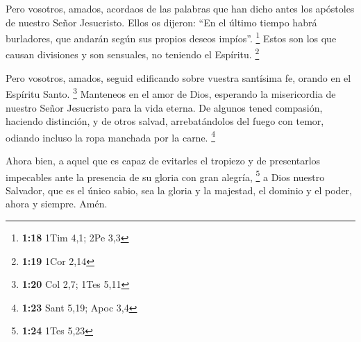  Pero vosotros, amados, acordaos de las palabras que han
dicho antes los apóstoles de nuestro Señor Jesucristo. 
Ellos os dijeron: ``En el último tiempo habrá burladores, que andarán
según sus propios deseos impíos''. \footnote{\textbf{1:18} 1Tim 4,1; 2Pe
  3,3}  Estos son los que causan divisiones y son
sensuales, no teniendo el Espíritu. \footnote{\textbf{1:19} 1Cor 2,14}

 Pero vosotros, amados, seguid edificando sobre vuestra
santísima fe, orando en el Espíritu Santo. \footnote{\textbf{1:20} Col
  2,7; 1Tes 5,11}  Manteneos en el amor de Dios,
esperando la misericordia de nuestro Señor Jesucristo para la vida
eterna.  De algunos tened compasión, haciendo distinción,
 y de otros salvad, arrebatándolos del fuego con temor,
odiando incluso la ropa manchada por la carne. \footnote{\textbf{1:23}
  Sant 5,19; Apoc 3,4}

 Ahora bien, a aquel que es capaz de evitarles el
tropiezo y de presentarlos impecables ante la presencia de su gloria con
gran alegría, \footnote{\textbf{1:24} 1Tes 5,23}  a Dios
nuestro Salvador, que es el único sabio, sea la gloria y la majestad, el
dominio y el poder, ahora y siempre. Amén.
